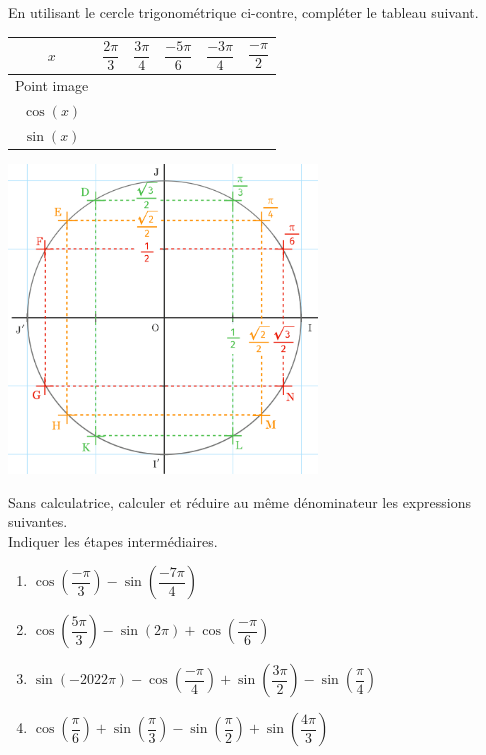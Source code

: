 \documentclass[a4paper,11pt,exos]{nsi} %
\begin{document}
\begin{minipage}{8.5cm}
	\exo{}
	En utilisant le cercle trigonométrique ci-contre, compléter le tableau suivant.
	\begin{center}
		\renewcommand{\arraystretch}{2}
		\begin{tabular}{|c|c|c|c|c|c|}
			\hline
			\cellcolor{UGLiOrange} $x$ & $\dfrac{2\pi}{3}$ & $\dfrac{3\pi}{4}$ & $\dfrac{-5\pi}{6}$ & $\dfrac{-3\pi}{4}$ & $\dfrac{-\pi}{2}$ \\
			\hline
			\cellcolor{UGLiOrange} Point image & \hspace{.7cm} & \hspace{.7cm} & \hspace{.7cm} & \hspace{.7cm} & \hspace{.7cm} \\
			\hline
			\cellcolor{UGLiOrange} $\cos(x)$ & & & & & \\
			\hline
			\cellcolor{UGLiOrange} $\sin(x)$ & & & & & \\
			\hline
		\end{tabular}
	\end{center}
\end{minipage}
\begin{minipage}{8.5cm}
	\flushright\includegraphics[width=8.2cm]{cercletrigo}
\end{minipage}


\exo{}
Sans calculatrice, calculer et réduire au même dénominateur les expressions suivantes.\\
Indiquer les étapes intermédiaires.
\begin{multicols}{2}
	\begin{enumerate}
		\item 	$\cos\left(\dfrac{-\pi}{3}\right)-\sin\left(\dfrac{-7\pi}{4}\right)$
		\item 	$\cos\left(\dfrac{5\pi}{3}\right)-\sin\left(2\pi\right)+\cos\left(\dfrac{-\pi}{6}\right)$	
		\item	$\sin\left(-2022\pi\right)-\cos\left(\dfrac{-\pi}{4}\right)+\sin\left(\dfrac{3\pi}{2}\right)-\sin\left(\dfrac{\pi}{4}\right)$
		\item	$\cos\left(\dfrac{\pi}{6}\right)+\sin\left(\dfrac{\pi}{3}\right)-\sin\left(\dfrac{\pi}{2}\right)+\sin\left(\dfrac{4\pi}{3}\right)$
	\end{enumerate}
\end{multicols}
\end{document}
